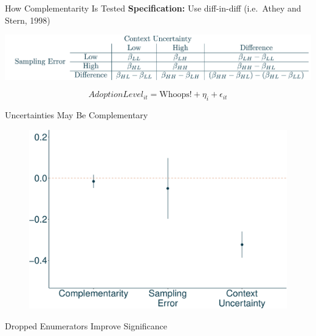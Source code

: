 \documentclass[
  ignorenonframetext,
]{beamer}
\begin{document}
\begin{frame}{How Complementarity Is Tested}
\protect\hypertarget{how-complementarity-is-tested-1}{}
\textbf{Specification:} Use diff-in-diff (i.e.~Athey and Stern, 1998)

\includegraphics[width=15.625in,height=\textheight]{diffindifftab.png}

$$
AdoptionLevel_{it} =  \text{Whoops!} + \eta_i + \epsilon_{it}
$$

\end{frame}

\begin{frame}{Uncertainties May Be Complementary}
\protect\hypertarget{uncertainties-may-be-complementary}{}
\begin{figure}

{\centering \includegraphics{presentation_lori_files/figure-beamer/unnamed-chunk-5-1.pdf}

}

\end{figure}

\begin{block}{Dropped Enumerators Improve Significance}
\protect\hypertarget{dropped-enumerators-improve-significance}{}
\begin{figure}


\end{figure}
\end{block}
\end{frame}
\end{document}
